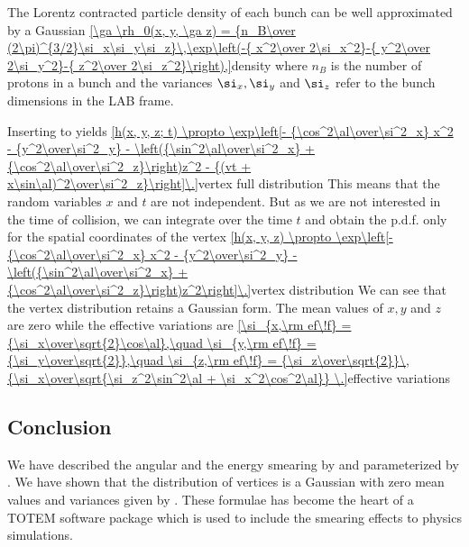 The Lorentz contracted particle density of each bunch can be well approximated by a Gaussian
\eqref{\ga \rh_0(x, y, \ga z) = {n_B\over (2\pi)^{3/2}\si_x\si_y\si_z}\,\exp\left(-{ x^2\over 2\si_x^2}-{ y^2\over 2\si_y^2}-{ z^2\over 2\si_z^2}\right),}{density}
where $n_B$ is the number of protons in a bunch and the variances $\si_x, \si_y$ and $\si_z$ refer to the bunch dimensions in the LAB frame.

Inserting  to  yields
\eqref{h(x, y, z; t) \propto \exp\left[- {\cos^2\al\over\si^2_x} x^2 - {y^2\over\si^2_y} - \left({\sin^2\al\over\si^2_x} + {\cos^2\al\over\si^2_z}\right)z^2 - {(vt + x\sin\al)^2\over\si^2_z}\right]\.}{vertex full distribution}
This means that the random variables $x$ and $t$ are not independent. But as we are not interested in the time of collision, we can integrate over the time $t$ and obtain the \hbox{p.d.f.} only for the spatial coordinates of the vertex
\eqref{h(x, y, z) \propto \exp\left[- {\cos^2\al\over\si^2_x} x^2 - {y^2\over\si^2_y} - \left({\sin^2\al\over\si^2_x} + {\cos^2\al\over\si^2_z}\right)z^2\right]\.}{vertex distribution}
We can see that the vertex distribution retains a Gaussian form. The mean values of $x, y$ and $z$ are zero while the effective variations are
\eqref{\si_{x,\rm ef\!f} = {\si_x\over\sqrt{2}\cos\al},\quad \si_{y,\rm ef\!f} = {\si_y\over\sqrt{2}},\quad \si_{z,\rm ef\!f} = {\si_z\over\sqrt{2}}\,{\si_x\over\sqrt{\si_z^2\sin^2\al + \si_x^2\cos^2\al}} \.}{effective variations}


\subsection{Conclusion}

We have described the angular and the energy smearing by  and parameterized by . We have shown that the distribution of vertices is a Gaussian with zero mean values and variances given by . These formulae has become the heart of a TOTEM software package which is used to include the smearing effects to physics simulations.
